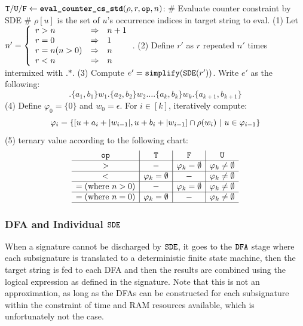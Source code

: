 \begin{small}
\begin{algorithm}[bt]
$\texttt{T}/\texttt{U}/\texttt{F} \leftarrow \texttt{\textbf{eval\_counter\_cs\_std}}(\rho, r, \texttt{op}, n)$:  \newline
\# Evaluate counter constraint by SDE \newline
\# $\rho[u]$ is the set of $u$'s occurrence indices in target string to eval.
\newline
(1) Let $n' = \left\{
	\begin{array}{l l l}
		r > n & \Rightarrow & n+1 \\
		r = 0 & \Rightarrow & 1 \\
		r = n (n>0) & \Rightarrow & n \\
		r < n & \Rightarrow & n
	\end{array}
	\right.
$. \newline
(2) Define $r'$ as $r$ repeated $n'$ times intermixed
with $\texttt{.*}$. \newline
(3) Compute $e' = \texttt{simplify}(\texttt{SDE}(r'))$.
Write $e'$ as the following:
\[
\texttt{.\{}a_1, b_1\texttt{\}} 
w_1 
\texttt{.\{}a_2, b_2\texttt{\}} 
w_2 
\ldots 
\texttt{.\{}a_k, b_k\texttt{\}} 
w_k
\texttt{.\{}a_{k+1}, b_{k+1}\texttt{\}} 
\]
(4) Define $\varphi_0 = \{0\}$ and $w_0 = \epsilon$.
For $i \in [k]$, iteratively compute:
\[
\varphi_i = \{[u + a_i + |w_{i-1}|, u + b_i + |w_{i-1}]
	\cap \rho(w_i)
	~|~ u\in \varphi_{i-1}\}
\]
(5) \return ternary value according to the following chart:
\[
\begin{array}{c|c|c|c}
	\texttt{op} & \texttt{T} & \texttt{F} & \texttt{U} \\
	\hline
      >  & - & \varphi_k = \emptyset & \varphi_k \neq \emptyset \\
	\hline
      <  & \varphi_k = \emptyset & - & \varphi_k \neq \emptyset \\
	\hline
      = (\textrm{where}~n>0)  & - & \varphi_k = \emptyset & \varphi_k \neq \emptyset \\
	\hline
      = (\textrm{where}~n=0)  &  \varphi_k = \emptyset & - & \varphi_k \neq \emptyset \\
	\hline
\end{array}
\]


\caption{Single Thread Distance Encoding Algorithms}
\label{fig:sde}
\end{algorithm}
\end{small}

\subsubsection{DFA and Individual $\texttt{SDE}$}
When a signature cannot be discharged by $\texttt{SDE}$, it goes to the $\texttt{DFA}$ stage
where each subsignature is translated to a deterministic finite state machine,
then the target string is fed to each DFA and then the results are combined
using the logical expression as defined in the signature. Note that 
this is not an approximation, as long as the DFAs can be constructed
for each subsignature within the constraint of time and RAM resources available,
which is unfortunately not the case.

